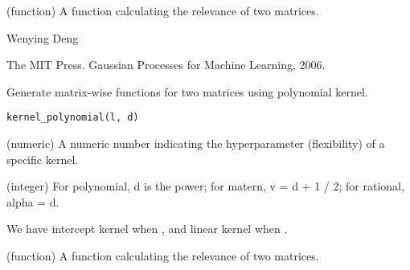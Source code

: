 \documentclass[a4paper]{book}
\begin{document}
%
\begin{Details}\relax
{} 
\end{Details}
%
\begin{Value}
\begin{ldescription}
\item[\code{matrix\_wise}] (function) A function calculating the relevance
of two matrices.
\end{ldescription}
\end{Value}
%
\begin{Author}\relax
Wenying Deng
\end{Author}
%
\begin{References}\relax
The MIT Press. Gaussian Processes for Machine Learning, 2006.
\end{References}
%
\begin{Description}\relax
Generate matrix-wise functions for two matrices using polynomial kernel.
\end{Description}
%
\begin{Usage}
\begin{verbatim}
kernel_polynomial(l, d)
\end{verbatim}
\end{Usage}
%
\begin{Arguments}
\begin{ldescription}
\item[\code{l}] (numeric) A numeric number indicating the hyperparameter
(flexibility) of a specific kernel.

\item[\code{d}] (integer) For polynomial, d is the power; for matern, v = d + 1 /
2; for rational, alpha = d.
\end{ldescription}
\end{Arguments}
%
\begin{Details}\relax
{}  We have intercept
kernel when , and linear kernel when .
\end{Details}
%
\begin{Value}
\begin{ldescription}
\item[\code{matrix\_wise}] (function) A function calculating the relevance
of two matrices.
\end{ldescription}
\end{Value}
\end{document}
